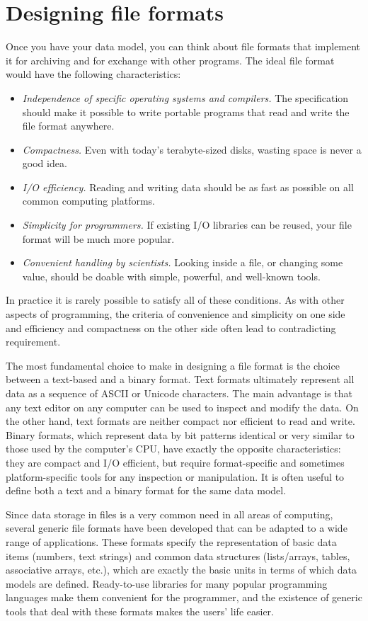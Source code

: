 \documentclass{csmagazine}
\begin{document}
\section*{Designing file formats}

Once you have your data model, you can think about file formats that implement it for archiving and for exchange with other programs. The ideal file format would have the following characteristics:
\begin{itemize}
\item \textit{Independence of specific operating systems and compilers.} The specification should make it possible to write portable programs that read and write the file format anywhere.
\item \textit{Compactness.} Even with today's terabyte-sized disks, wasting space is never a good idea.
\item \textit{I/O efficiency.} Reading and writing data should be as fast as possible on all common computing platforms.
\item \textit{Simplicity for programmers.} If existing I/O libraries can be reused, your file format will be much more popular.
\item \textit{Convenient handling by scientists.} Looking inside a file, or changing some value, should be doable with simple, powerful, and well-known tools.
\end{itemize}

In practice it is rarely possible to satisfy all of these conditions. As with other aspects of programming, the criteria of convenience and simplicity on one side and efficiency and compactness on the other side often lead to contradicting requirement.

The most fundamental choice to make in designing a file format is the choice between a text-based and a binary format. Text formats ultimately represent all data as a sequence of ASCII or Unicode characters. The main advantage is that any text editor on any computer can be used to inspect and modify the data. On the other hand, text formats are neither compact nor efficient to read and write. Binary formats, which represent data by bit patterns identical or very similar to those used by the computer's CPU, have exactly the opposite characteristics: they are compact and I/O efficient, but require format-specific and sometimes platform-specific tools for any inspection or manipulation. It is often useful to define both a text and a binary format for the same data model.

Since data storage in files is a very common need in all areas of computing, several generic file formats have been developed that can be adapted to a wide range of applications. These formats specify the representation of basic data items (numbers, text strings) and common data structures (lists/arrays, tables, associative arrays, etc.), which are exactly the basic units in terms of which data models are defined. Ready-to-use libraries for many popular programming languages make them convenient for the programmer, and the existence of generic tools that deal with these formats makes the users' life easier.
\end{document}
